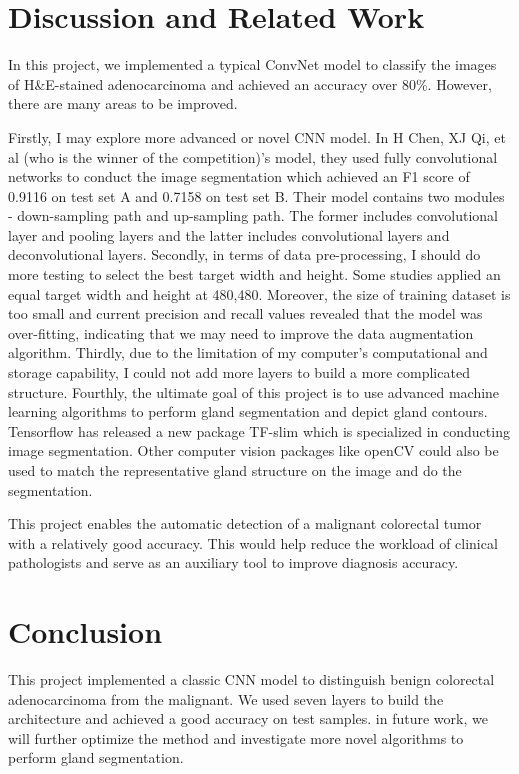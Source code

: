 \documentclass[twoside,11pt]{article}
\begin{document}
\newpage
\section{Discussion and Related Work} 
In this project, we implemented a typical ConvNet model to classify the images of H&E-stained adenocarcinoma and achieved an accuracy over 80\%. However, there are many areas to be improved. 

Firstly, I may explore more advanced or novel CNN model. In H Chen, XJ Qi, et al \citep{9} (who is the winner of the competition)'s model, they used fully convolutional networks to conduct the image segmentation which achieved an F1 score of 0.9116 on test set A and 0.7158 on test set B. Their model contains two modules - down-sampling path and up-sampling path. The former includes convolutional layer and pooling layers and the latter includes convolutional layers and deconvolutional layers. 
Secondly, in terms of data pre-processing, I should do more testing to select the best target width and height. Some studies applied an equal target width and height at 480,480. Moreover, the size of training dataset is too small and current precision and recall values revealed that the model was over-fitting, indicating that we may need to improve the data augmentation algorithm. 
Thirdly, due to the limitation of my computer's computational and storage capability, I could not add more layers to build a more complicated structure. Fourthly, the ultimate goal of this project is to use advanced machine learning algorithms to perform gland segmentation and depict gland contours. Tensorflow has released a new package TF-slim which is specialized in conducting image segmentation. Other computer vision packages like openCV could also be used to match the representative gland structure on the image and do the segmentation.  

This project enables the automatic detection of a malignant colorectal tumor with a relatively good accuracy. This would help reduce the workload of clinical pathologists and serve as an auxiliary tool to improve diagnosis accuracy. 

\section{Conclusion} 
This project implemented a classic CNN model to distinguish benign colorectal adenocarcinoma from the malignant. We used seven layers to build the architecture and achieved a good accuracy on test samples. in future work, we will further optimize the method and investigate more novel algorithms to perform gland segmentation. 
\end{document}
